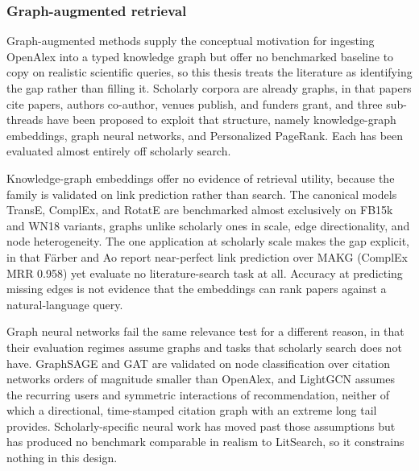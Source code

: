 \subsubsection{Graph-augmented retrieval}
\label{sec:lr-graph}

Graph-augmented methods supply the conceptual motivation for ingesting
OpenAlex into a typed knowledge graph but offer no benchmarked baseline
to copy on realistic scientific queries, so this thesis treats the
literature as identifying the gap rather than filling it.  Scholarly
corpora are already graphs, in that papers cite papers, authors
co-author, venues publish, and funders grant, and three sub-threads
have been proposed to exploit that structure, namely knowledge-graph
embeddings, graph neural networks, and Personalized PageRank.  Each has
been evaluated almost entirely off scholarly search.

Knowledge-graph embeddings offer no evidence of retrieval utility,
because the family is validated on link prediction rather than search.
The canonical models TransE, ComplEx, and RotatE
\cite{bordes2013transe,trouillon2016complex,sun2019rotate} are
benchmarked almost exclusively on FB15k and WN18 variants, graphs
unlike scholarly ones in scale, edge directionality, and node
heterogeneity.  The one application at scholarly scale makes the gap
explicit, in that F\"arber and Ao \cite{farber2022makgenhanced} report
near-perfect link prediction over MAKG (ComplEx MRR 0.958) yet evaluate
no literature-search task at all.  Accuracy at predicting missing edges
is not evidence that the embeddings can rank papers against a
natural-language query.

Graph neural networks fail the same relevance test for a different
reason, in that their evaluation regimes assume graphs and tasks that
scholarly search does not have.  GraphSAGE \cite{hamilton2017graphsage}
and GAT \cite{velickovic2018gat} are validated on node classification
over citation networks orders of magnitude smaller than OpenAlex, and
LightGCN \cite{he2020lightgcn} assumes the recurring users and
symmetric interactions of recommendation, neither of which a
directional, time-stamped citation graph with an extreme long tail
provides.  Scholarly-specific neural work has moved past those
assumptions \cite{bhagavatula2018citeomatic,shen2024tgntrec} but has
produced no benchmark comparable in realism to LitSearch, so it
constrains nothing in this design.


